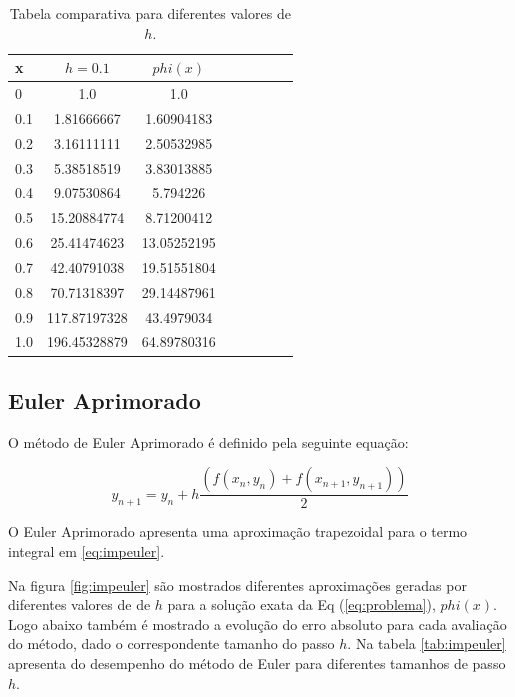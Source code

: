 \documentclass[a4paper]{article}
\begin{document}
\begin{table}[!h]
\centering
\begin{tabular}{l*{6}{c}r}

x               & $h=0.1$ & $phi(x)$ \\
\hline
0                   & 1.0 & 1.0          \\
0.1                 & 1.81666667 & 1.60904183   \\
0.2                 & 3.16111111 & 2.50532985   \\
0.3                 & 5.38518519 & 3.83013885   \\
0.4                 & 9.07530864 & 5.794226     \\
0.5                 & 15.20884774 & 8.71200412   \\
0.6                 & 25.41474623 & 13.05252195  \\
0.7                 & 42.40791038 & 19.51551804  \\
0.8                 & 70.71318397 & 29.14487961  \\
0.9                 & 117.87197328 & 43.4979034   \\
1.0                 & 196.45328879 & 64.89780316  \\
\end{tabular}
\caption{\label{tab:beuler}Tabela comparativa para diferentes valores de $h$.}
\end{table}

\pagebreak

\subsection{Euler Aprimorado}

O método de Euler Aprimorado é definido pela seguinte equação:

\begin{equation}
\label{eq:impeuler}
y_{n+1} = y_{n} + h\frac{(f(x_{n},y_{n})+f(x_{n+1},y_{n+1}))}{2}
\end{equation}

O Euler Aprimorado apresenta uma aproximação trapezoidal para o termo integral em \ref{eq:impeuler}.

Na figura \ref{fig:impeuler} são mostrados diferentes aproximações geradas por diferentes valores de de $h$ para a solução exata da Eq (\ref{eq:problema}), $phi(x)$. Logo abaixo também é mostrado a evolução do erro absoluto para cada avaliação do método, dado o correspondente tamanho do passo $h$. Na tabela \ref{tab:impeuler} apresenta do desempenho do método de Euler para diferentes tamanhos de passo $h$.
\end{document}
